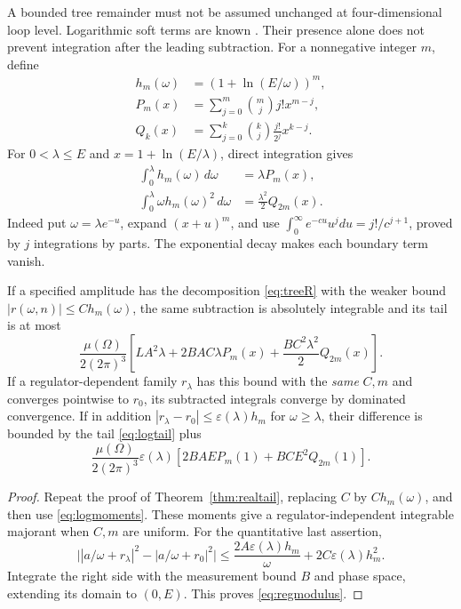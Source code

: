 A bounded tree remainder must not be assumed unchanged at four-dimensional loop level. Logarithmic soft terms are known \cite{SahooSen19}. Their presence alone does not prevent integration after the leading subtraction. For a nonnegative integer $m$, define
\begin{align}
 h_m(\omega)&=(1+\ln(E/\omega))^m,\\
 P_m(x)&=\sum_{j=0}^m\binom mj j!x^{m-j},\\
 Q_k(x)&=\sum_{j=0}^k\binom kj\frac{j!}{2^j}x^{k-j}.
\end{align}
For $0<\lambda\le E$ and $x=1+\ln(E/\lambda)$, direct integration gives
\begin{align}\label{eq:logmoments}
 \int_0^\lambda h_m(\omega)\,d\omega&=\lambda P_m(x),\\
 \int_0^\lambda\omega h_m(\omega)^2\,d\omega
 &=\frac{\lambda^2}{2}Q_{2m}(x).
\end{align}
Indeed put $\omega=\lambda e^{-u}$, expand $(x+u)^m$, and use $\int_0^\infty e^{-cu}u^jdu=j!/c^{j+1}$, proved by $j$ integrations by parts. The exponential decay makes each boundary term vanish.

\begin{proposition}\label{prop:logremainder}
If a specified amplitude has the decomposition \eqref{eq:treeR} with the weaker bound $|r(\omega,n)|\le Ch_m(\omega)$, the same subtraction is absolutely integrable and its tail is at most
\begin{equation}\label{eq:logtail}
 \frac{\mu(\Omega)}{2(2\pi)^3}
 \left[LA^2\lambda+2BAC\lambda P_m(x)
       +\frac{BC^2\lambda^2}{2}Q_{2m}(x)\right].
\end{equation}
If a regulator-dependent family $r_\lambda$ has this bound with the \emph{same} $C,m$ and converges pointwise to $r_0$, its subtracted integrals converge by dominated convergence. If in addition $|r_\lambda-r_0|\le\varepsilon(\lambda)h_m$ for $\omega\ge\lambda$, their difference is bounded by the tail \eqref{eq:logtail} plus
\begin{equation}\label{eq:regmodulus}
 \frac{\mu(\Omega)}{2(2\pi)^3}\varepsilon(\lambda)
 \left[2BA E P_m(1)+BC E^2Q_{2m}(1)\right].
\end{equation}
\end{proposition}
\begin{proof}
Repeat the proof of Theorem~\ref{thm:realtail}, replacing $C$ by $Ch_m(\omega)$, and then use \eqref{eq:logmoments}. These moments give a regulator-independent integrable majorant when $C,m$ are uniform. For the quantitative last assertion,
\[
 \big||a/\omega+r_\lambda|^2-|a/\omega+r_0|^2\big|
 \le\frac{2A\varepsilon(\lambda)h_m}{\omega}
       +2C\varepsilon(\lambda)h_m^2.
\]
Integrate the right side with the measurement bound $B$ and phase space, extending its domain to $(0,E)$. This proves \eqref{eq:regmodulus}.
\end{proof}

